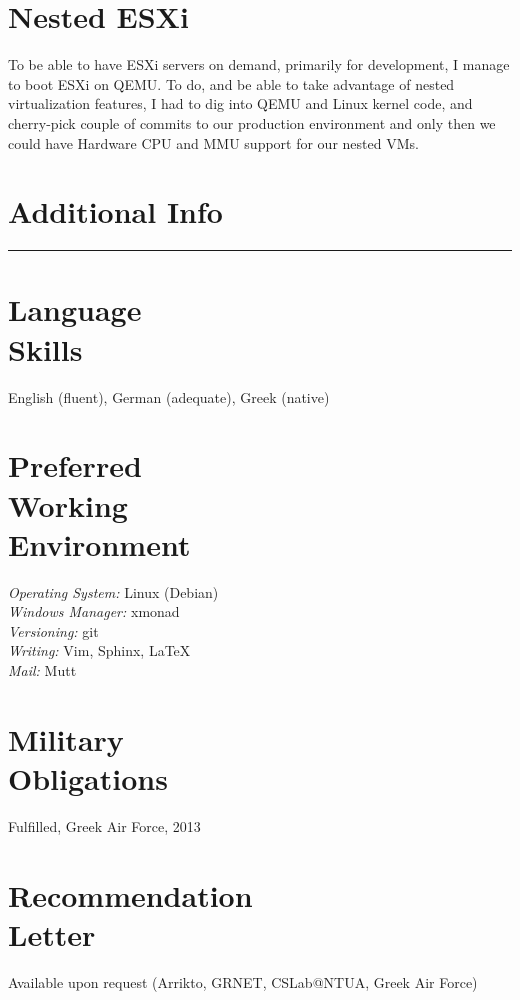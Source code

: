 \documentclass[margin,centered]{res}
\begin{document}
\begin{resume}
\section{\sc Nested ESXi}
To be able to have ESXi servers on demand, primarily for development, I manage
to boot ESXi on QEMU. To do, and be able to take advantage of nested
virtualization features, I had to dig into QEMU and Linux kernel code, and
cherry-pick couple of commits to our production environment and only then we
could have Hardware CPU and MMU support for our nested VMs.


\section{Additional Info}
\rule[3pt]{\textwidth}{0.4pt}

\section{\sc Language\\Skills}
English (fluent), German (adequate), Greek (native)

\section{\sc Preferred\\Working\\Environment}
\textit{Operating System:} Linux (Debian)\\
\textit{Windows Manager:} xmonad\\
\textit{Versioning:} git\\
\textit{Writing:} Vim, Sphinx, \LaTeX\\
\textit{Mail:} Mutt

\section{\sc Military\\Obligations}
Fulfilled, Greek Air Force, 2013

\section{\sc Recommendation\\Letter}
Available upon request (Arrikto, GRNET, CSLab@NTUA, Greek Air Force)

\end{resume}

\def\enoteheading{\section{Notes}\rule[0pt]{\textwidth}{0.4pt}}
\parskip=2pt
\theendnotes
\end{document}
